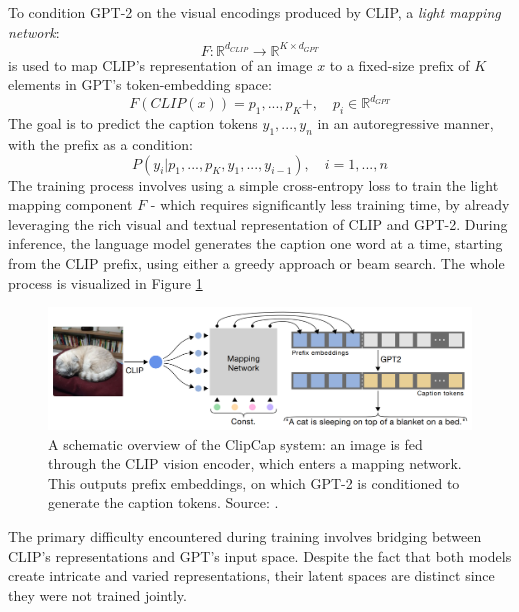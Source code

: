 \documentclass{article}
\begin{document}
\medskip
\noindent
To condition GPT-2 on the visual encodings produced by CLIP, a \emph{light mapping network}:
\begin{equation*}
    F: \mathbb{R}^{d_{CLIP}} \rightarrow \mathbb{R}^{K \times d_{GPT}}
\end{equation*}
is used to map CLIP's representation of an image $x$ to a fixed-size prefix of $K$ elements in GPT's token-embedding space:
\begin{equation*}
    F(CLIP(x)) = p_1,...,p_K+, \quad p_i \in \mathbb{R}^{d_{GPT}}
\end{equation*}
The goal is to predict the caption tokens $y_1,...,y_n$ in an autoregressive manner, with the prefix as a condition:
\begin{equation*}
    P(y_i | p_1,...,p_K,y_1,...,y_{i-1}),\quad i = 1,...,n
\end{equation*}
The training process involves using a simple cross-entropy loss to train the light mapping component $F$ - which requires significantly less training time, by already leveraging the rich visual and textual representation of CLIP and GPT-2. During inference, the language model generates the caption one word at a time, starting from the CLIP prefix, using either a greedy approach or beam search. The whole process is visualized in Figure \ref{fig:clipcap_fig2}

\begin{figure}[ht!]
    \begin{center}
        \includegraphics[width=1.0\textwidth]{figures/clipcap_fig2.png}
    \end{center}
    \caption{
        A schematic overview of the ClipCap system: an image is fed through the CLIP vision encoder, which enters a mapping network. This outputs prefix embeddings, on which GPT-2 is conditioned to generate the caption tokens. Source: \citet{mokady2021clipcap}.
    }
    \label{fig:clipcap_fig2}
\end{figure}

\noindent
The primary difficulty encountered during training involves bridging between CLIP's representations and GPT's input space. Despite the fact that both models create intricate and varied representations, their latent spaces are distinct since they were not trained jointly.
\end{document}
